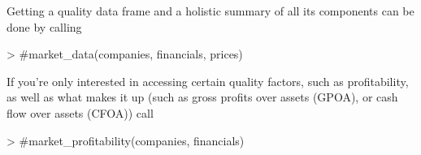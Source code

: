 \documentclass[titlepage]{article}
\begin{document}
Getting a quality data frame and a holistic summary of all its components can be done by calling

\begin{Schunk}
\begin{Sinput}
> #market_data(companies, financials, prices)
\end{Sinput}
\end{Schunk}

If you're only interested in accessing certain quality factors, such as profitability, as well as what makes it up (such as gross profits over assets (GPOA), or cash flow over assets (CFOA)) call

\begin{Schunk}
\begin{Sinput}
> #market_profitability(companies, financials)
\end{Sinput}
\end{Schunk}
\end{document}
